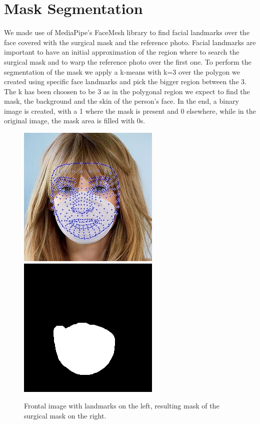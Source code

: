 \documentclass[10pt,twocolumn,letterpaper]{article}
\begin{document}
\section{Mask Segmentation}
We made use of MediaPipe's FaceMesh \cite{DBLP:journals/corr/abs-1907-06724}
library to find facial landmarks over the face covered with the surgical mask
and the reference photo. Facial landmarks are important to have an initial
approximation of the region where to search the surgical mask and to warp the
reference photo over the first one. To perform the segmentation of the mask we
apply a k-means with k=3 over the polygon we created using specific face
landmarks and pick the bigger region between the 3.  The k has been choosen to
be 3 as in the polygonal region we expect to find the mask, the background and
the skin of the person's face. In the end, a binary image is created, with a 1
where the mask is present and 0 elsewhere, while in the original image, the mask
area is filled with 0s.
\begin{figure}
  \caption{Frontal image with landmarks on the left, resulting mask of the
  surgical mask on the right.}
  \includegraphics[width=0.49\linewidth]{img/landmarks_front.jpeg}
  \includegraphics[width=0.49\linewidth]{img/dilated.jpeg}
\end{figure}
\end{document}
